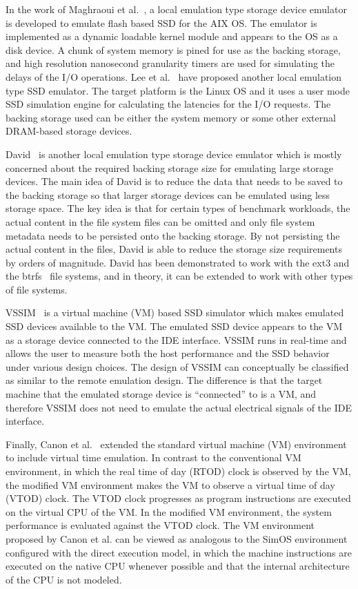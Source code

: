 In the work of Maghraoui et al.~\cite{ElMaghraoui:2010}, a local emulation type storage device emulator is developed to emulate flash based SSD for the AIX OS. The emulator is implemented as a dynamic loadable kernel module and appears to the OS as a disk device. A chunk of system memory is pined for use as the backing storage, and high resolution nanosecond granularity timers are used for simulating the delays of the I/O operations. Lee et al.~\cite{Lee:2012} have proposed another local emulation type SSD emulator. The target platform is the Linux OS and it uses a user mode SSD simulation engine for calculating the latencies for the I/O requests. The backing storage used can be either the system memory or some other external DRAM-based storage devices.

David~\cite{Agrawal:2012} is another local emulation type storage device emulator which is mostly concerned about the required backing storage size for emulating large storage devices. The main idea of David is to reduce the data that needs to be saved to the backing storage so that larger storage devices can be emulated using less storage space. The key idea is that for certain types of benchmark workloads, the actual content in the file system files can be omitted and only file system metadata needs to be persisted onto the backing storage. By not persisting the actual content in the files, David is able to reduce the storage size requirements by orders of magnitude. David has been demonstrated to work with the ext3 and the btrfs~\cite{wiki:btrfs} file systems, and in theory, it can be extended to work with other types of file systems.

VSSIM~\cite{Yoo:2013} is a virtual machine (VM) based SSD simulator which makes emulated SSD devices available to the VM. The emulated SSD device appears to the VM as a storage device connected to the IDE interface. VSSIM runs in real-time and allows the user to measure both the host performance and the SSD behavior under various design choices. The design of VSSIM can conceptually be classified as similar to the remote emulation design. The difference is that the target machine that the emulated storage device is ``connected'' to is a VM, and therefore VSSIM does not need to emulate the actual electrical signals of the IDE interface.

Finally, Canon et al.~\cite{Canon:1980} extended the standard virtual machine (VM) environment to include virtual time emulation. In contrast to the conventional VM environment, in which the real time of day (RTOD) clock is observed by the VM, the modified VM environment makes the VM to observe a virtual time of day (VTOD) clock. The VTOD clock progresses as program instructions are executed on the virtual CPU of the VM. In the modified VM environment, the system performance is evaluated against the VTOD clock. The VM environment proposed by Canon et al. can be viewed as analogous to the SimOS environment configured with the direct execution model, in which the machine instructions are executed on the native CPU whenever possible and that the internal architecture of the CPU is not modeled.
